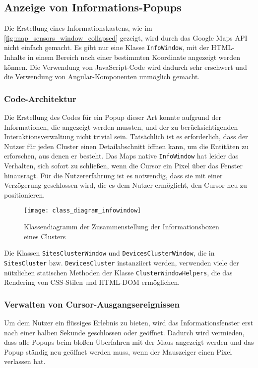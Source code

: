 \subsection{Anzeige von Informations-Popups}

Die Erstellung eines Informationskastens, wie im \ref{fig:map_sensors_window_collapsed} gezeigt, wird durch das Google Maps API nicht einfach gemacht.
Es gibt nur eine Klasse \lstinline{InfoWindow}, mit der HTML-Inhalte in einem Bereich nach einer bestimmten Koordinate angezeigt werden können.
Die Verwendung von JavaScript-Code wird dadurch sehr erschwert und die Verwendung von Angular-Komponenten unmöglich gemacht.

\subsubsection{Code-Architektur}

Die Erstellung des Codes für ein Popup dieser Art konnte aufgrund der Informationen, die angezeigt werden mussten, und der zu berücksichtigenden Interaktionsverwaltung nicht trivial sein.
Tatsächlich ist es erforderlich, dass der Nutzer für jeden Cluster einen Detailabschnitt öffnen kann, um die Entitäten zu erforschen, aus denen er besteht.
Das Maps native \lstinline{InfoWindow} hat leider das Verhalten, sich sofort zu schließen, wenn die Cursor ein Pixel über das Fenster hinausragt.
Für die Nutzererfahrung ist es notwendig, dass sie mit einer Verzögerung geschlossen wird, die es dem Nutzer ermöglicht, den Cursor neu zu positionieren.

\begin{figure}[H]
  \centering
  \texttt{[image: class\_diagram\_infowindow]}
  \caption{Klassendiagramm der Zusammenstellung der Informationsboxen eines Clusters}
  \label{fig:class_diagram_infowindow}
\end{figure}

Die Klassen \lstinline{SitesClusterWindow} und \lstinline{DevicesClusterWindow}, die in \lstinline{SitesCluster} bzw. \lstinline{DevicesCluster} instanziiert werden, verwenden viele der nützlichen statischen Methoden der Klasse \lstinline{ClusterWindowHelpers}, die das Rendering von CSS-Stilen und HTML-DOM ermöglichen.

\subsubsection{Verwalten von Cursor-Ausgangsereignissen}

Um dem Nutzer ein flüssiges Erlebnis zu bieten, wird das Informationsfenster erst nach einer halben Sekunde geschlossen oder geöffnet.
Dadurch wird vermieden, dass alle Popups beim bloßen Überfahren mit der Maus angezeigt werden und das Popup ständig neu geöffnet werden muss, wenn der Mauszeiger einen Pixel verlassen hat.

